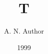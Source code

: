 \documentclass{report}
\makeatletter
\renewcommand{\maketitle}{\begin{titlepage}\begin{center}{\LARGE\@title}\\ \@author\\
  Doctor of Philosophy\\ The University of Nowhere\\ \@date\end{center}\end{titlepage}}
\makeatother
\title{T}\author{A. N. Author}\date{1999}

\maketitle
Body.


